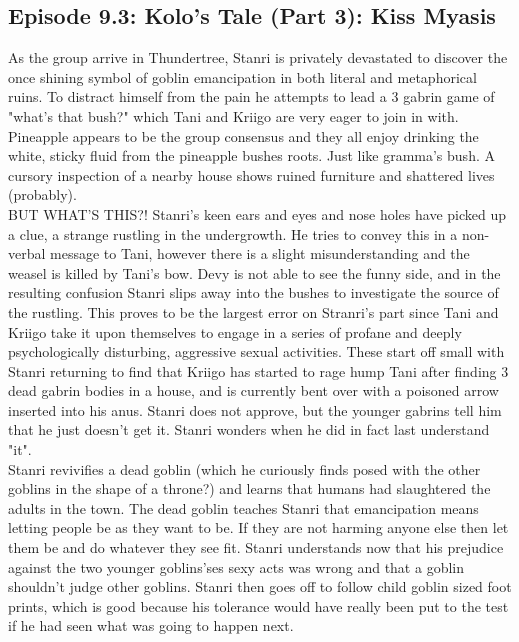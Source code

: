 \subsection{Episode 9.3: Kolo's Tale (Part 3): Kiss Myasis}
As the group arrive in Thundertree, Stanri is privately devastated to discover the once shining symbol of goblin emancipation in both literal and metaphorical ruins. To distract himself from the pain he attempts to lead a 3 gabrin game of "what's that bush?" which Tani and Kriigo are very eager to join in with. Pineapple appears to be the group consensus and they all enjoy drinking the white, sticky fluid from the pineapple bushes roots. Just like gramma's bush. A cursory inspection of a nearby house shows ruined furniture and shattered lives (probably).\\

BUT WHAT'S THIS?! Stanri's keen ears and eyes and nose holes have picked up a clue, a strange rustling in the undergrowth. He tries to convey this in a non-verbal message to Tani, however there is a slight misunderstanding and the weasel is killed by Tani's bow. Devy is not able to see the funny side, and in the resulting confusion Stanri slips away into the bushes to investigate the source of the rustling. This proves to be the largest error on Stranri's part since Tani and Kriigo take it upon themselves to engage in a series of profane and deeply psychologically disturbing, aggressive sexual activities. These start off small with Stanri returning to find that Kriigo has started to rage hump Tani after finding 3 dead gabrin bodies in a house, and is currently bent over with a poisoned arrow inserted into his anus. Stanri does not approve, but the younger gabrins tell him that he just doesn't get it. Stanri wonders when he did in fact last understand "it".\\

Stanri revivifies a dead goblin (which he curiously finds posed with the other goblins in the shape of a throne?) and learns that humans had slaughtered the adults in the town. The dead goblin teaches Stanri that emancipation means letting people be as they want to be. If they are not harming anyone else then let them be and do whatever they see fit. Stanri understands now that his prejudice against the two younger goblins'ses sexy acts was wrong and that a goblin shouldn't judge other goblins. Stanri then goes off to follow child goblin sized foot prints, which is good because his tolerance would have really been put to the test if he had seen what was going to happen next.\\

